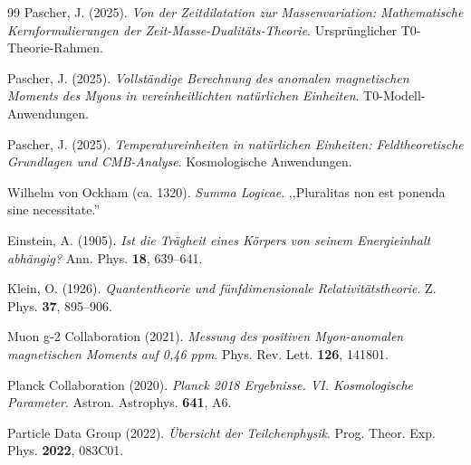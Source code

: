 \begin{thebibliography}{99}
		Pascher, J. (2025). \textit{Von der Zeitdilatation zur Massenvariation: Mathematische Kernformulierungen der Zeit-Masse-Dualitäts-Theorie}. Ursprünglicher T0-Theorie-Rahmen.
		
		Pascher, J. (2025). \textit{Vollständige Berechnung des anomalen magnetischen Moments des Myons in vereinheitlichten natürlichen Einheiten}. T0-Modell-Anwendungen.
		
		Pascher, J. (2025). \textit{Temperatureinheiten in natürlichen Einheiten: Feldtheoretische Grundlagen und CMB-Analyse}. Kosmologische Anwendungen.
		
		Wilhelm von Ockham (ca. 1320). \textit{Summa Logicae}. ,,Pluralitas non est ponenda sine necessitate.''
		
		Einstein, A. (1905). \textit{Ist die Trägheit eines Körpers von seinem Energieinhalt abhängig?} Ann. Phys. \textbf{18}, 639--641.
		
		Klein, O. (1926). \textit{Quantentheorie und fünfdimensionale Relativitätstheorie}. Z. Phys. \textbf{37}, 895--906.
		
		Muon g-2 Collaboration (2021). \textit{Messung des positiven Myon-anomalen magnetischen Moments auf 0{,}46 ppm}. Phys. Rev. Lett. \textbf{126}, 141801.
		
		Planck Collaboration (2020). \textit{Planck 2018 Ergebnisse. VI. Kosmologische Parameter}. Astron. Astrophys. \textbf{641}, A6.
		
		Particle Data Group (2022). \textit{Übersicht der Teilchenphysik}. Prog. Theor. Exp. Phys. \textbf{2022}, 083C01.
	\end{thebibliography}
